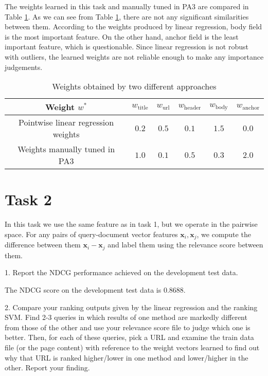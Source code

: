 The weights learned in this task and manually tuned in PA3 are compared in Table \ref{tab:wt}.
As we can see from Table \ref{tab:wt}, there are not any significant similarities between them.
According to the weights produced by linear regression, body field is the most important feature. On the other hand,
anchor field is the least important feature, which is questionable. Since linear regression is not robust with outliers,
the learned weights are not reliable enough to make any importance judgements.
\begin{table}
\begin{center}
\begin{tabular}{|c|c|c|c|c|c|}
  \hline
  Weight $w^*$ & $w_\textrm{title}$ & $w_\textrm{url}$ & $w_\textrm{header}$ & $w_\textrm{body}$ & $w_\textrm{anchor}$ \\
  \hline
  Pointwise linear regression weights & $0.2$ & $0.5$ & $0.1$ & $1.5$ & $0.0$ \\
  \hline
  Weights manually tuned in PA3 & $1.0$ & $0.1$ & $0.5$ & $0.3$ & $2.0$ \\
  \hline
\end{tabular}
\caption{Weights obtained by two different approaches}\label{tab:wt}
\end{center}
\end{table}


\section{Task 2}
In this task we use the same feature as in task 1, but we operate in the pairwise space.
For any pairs of query-document vector features $\mathbf{x}_i, \mathbf{x}_j$, we compute the difference between them $\mathbf{x}_i - \mathbf{x}_j$ and label them using the relevance score between them. 

1. Report the NDCG performance achieved on the development test data.

The NDCG score on the development test data is $0.8688$.


2. Compare your ranking outputs given by the linear regression and the ranking SVM.
Find 2-3 queries in which results of one method are markedly different from those
of the other and use your relevance score file to judge which one is better.
Then, for each of these queries, pick a URL and examine the train data file (or the
page content) with reference to the weight vectors learned to find out why that
URL is ranked higher/lower in one method and lower/higher in the other. Report
your finding.

